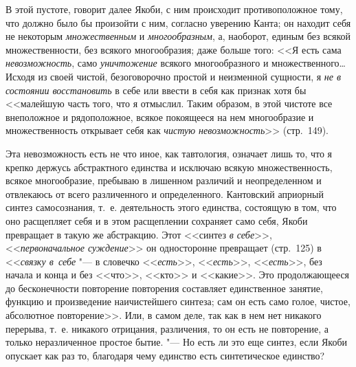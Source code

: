 В этой пустоте, говорит далее Якоби, с ним происходит противоположное тому,
что должно было бы произойти с ним, согласно уверению Канта; он находит
себя не некоторым {\em множественным} и
{\em многообразным}, а, наоборот, единым без всякой
множественности, без всякого многообразия; даже больше того: <<Я есть
сама {\em невозможность}, само {\em уничтожение} всякого многообразного и
множественного\ldots Исходя из своей чистой, безоговорочно простой и
неизменной сущности, я {\em не в состоянии
восстановить} в себе или ввести в себя как признак хотя бы <<малейшую часть
того, что я отмыслил. Таким образом, в этой чистоте все внеположное и
рядоположное, всякое покоящееся на нем многообразие и множественность
открывает себя как {\em чистую невозможность}>> (стр.~149).

Эта невозможность есть не что иное, как тавтология, означает лишь то, что я
крепко держусь абстрактного единства и исключаю всякую множественность,
всякое многообразие, пребываю в лишенном различий и неопределенном и
отвлекаюсь от всего различенного и определенного. Кантовский априорный
синтез самосознания, т.~е. деятельность этого единства, состоящую в том,
что оно расщепляет себя и в этом расщеплении сохраняет само себя, Якоби
превращает в такую же абстракцию. Этот <<синтез {\em в себе}>>,
<<{\em первоначальное суждение}>> он односторонне превращает (стр.~125)
в <<{\em связку в~себе} "--- в словечко <<{\em есть}>>, <<{\em есть}>>,
<<{\em есть}>>, без начала и конца и без <<что>>, <<кто>> и
<<какие>>. Это продолжающееся до бесконечности повторение повторения
составляет единственное занятие, функцию и произведение наичистейшего
синтеза; сам он есть само голое, чистое, абсолютное повторение>>. Или, в
самом деле, так как в нем нет никакого перерыва, т.~е. никакого отрицания,
различения, то он есть не повторение, а только неразличенное простое бытие.
"--- Но есть ли это еще синтез, если Якоби опускает как раз то, благодаря чему
единство есть синтетическое единство?

